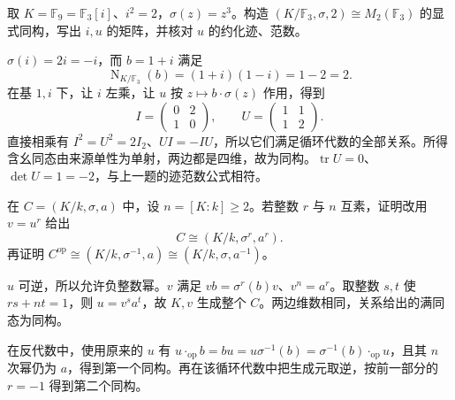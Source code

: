 \begin{exercise}\label{b2:ex:18-f9-cyclic-matrices}
	取 \(K=\mathbb F_9=\mathbb F_3[i]\)、\(i^2=2\)，\(\sigma(z)=z^3\)。构造 \((K/\mathbb F_3,\sigma,2)\cong M_2(\mathbb F_3)\) 的显式同构，写出 \(i,u\) 的矩阵，并核对 \(u\) 的约化迹、范数。
\end{exercise}
\begin{solution}
	\(\sigma(i)=2i=-i\)，而 \(b=1+i\) 满足
	\[
		\operatorname{N}_{K/\mathbb F_3}(b)=(1+i)(1-i)=1-2=2.
	\]
	在基 \(1,i\) 下，让 \(i\) 左乘，让 \(u\) 按 \(z\mapsto b\cdot\sigma(z)\) 作用，得到
	\[
		I=\begin{pmatrix}0&2\\1&0\end{pmatrix},\qquad
		U=\begin{pmatrix}1&1\\1&2\end{pmatrix}.
	\]
	直接相乘有 \(I^2=U^2=2I_2\)、\(UI=-IU\)，所以它们满足循环代数的全部关系。所得含幺同态由来源单性为单射，两边都是四维，故为同构。\(\operatorname{tr}U=0\)、\(\det U=1=-2\)，与上一题的迹范数公式相符。
\end{solution}

\begin{exercise}\label{b2:ex:18-cyclic-generator-opposite}
	在 \(C=(K/k,\sigma,a)\) 中，设 \(n=[K:k]\ge2\)。若整数 \(r\) 与 \(n\) 互素，证明改用 \(v=u^r\) 给出
	\[
		C\cong(K/k,\sigma^r,a^r).
	\]
	再证明 \(C^{\mathrm{op}}\cong(K/k,\sigma^{-1},a)\cong(K/k,\sigma,a^{-1})\)。
\end{exercise}
\begin{solution}
	\(u\) 可逆，所以允许负整数幂。\(v\) 满足 \(vb=\sigma^r(b)v\)、\(v^n=a^r\)。取整数 \(s,t\) 使 \(rs+nt=1\)，则 \(u=v^s a^t\)，故 \(K,v\) 生成整个 \(C\)。两边维数相同，关系给出的满同态为同构。

	在反代数中，使用原来的 \(u\) 有 \(u\mathbin{\cdot_{\mathrm{op}}}b=bu=u\sigma^{-1}(b)=\sigma^{-1}(b)\mathbin{\cdot_{\mathrm{op}}}u\)，且其 \(n\) 次幂仍为 \(a\)，得到第一个同构。再在该循环代数中把生成元取逆，按前一部分的 \(r=-1\) 得到第二个同构。
\end{solution}

